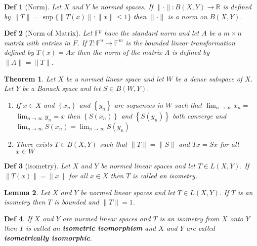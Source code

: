 \documentclass[10pt]{paper}
\newtheorem{theorem}{Theorem}[section]
\newtheorem{definition}{Def}[section]
\newtheorem{lemma}[theorem]{Lemma}
\begin{document}
\begin{definition}[Norm]
    Let $X$ and $Y$ be normed spaces. If $\|\cdot\|: B(X, Y) \rightarrow \mathbb{R}$ is defined by $ \|T\|=\sup \{\|T(x)\|:\|x\| \leq 1\} $ then $\|\cdot\|$ is a norm on $B(X, Y)$.
\end{definition}

\begin{definition}[Norm of Matrix]
    Let $\mathbb{F}^{p}$ have the standard norm and let $A$ be a $m \times n$ matrix with entries in $F$. If $T: \mathbb{F}^{n} \rightarrow \mathbb{F}^{m}$ is the bounded linear transformation defined by $T(x)=A x$ then the norm of the matrix $A$ is defined by $\|A\|=\|T\|$.
\end{definition}

\begin{theorem}
    Let $X$ be a normed linear space and let $W$ be a dense subspace of $X .$ Let $Y$ be a Banach space and let $S \in B(W, Y)$.
    \begin{enumerate}
        \item If $x \in X$ and $\left\{x_{n}\right\}$ and $\left\{y_{n}\right\}$ are sequences in $W$ such that $\lim _{n \rightarrow \infty} x_{n}=$ $\lim _{n \rightarrow \infty} y_{n}=x$ then $\left\{S\left(x_{n}\right)\right\}$ and $\left\{S\left(y_{n}\right)\right\}$ both converge and $\lim _{n \rightarrow \infty} S\left(x_{n}\right) = \lim _{n \rightarrow \infty} S\left(y_{n}\right)
              $
        \item There exists $T \in B(X, Y)$ such that $\|T\|=\|S\|$ and $T x=S x$ for all $x \in W$
    \end{enumerate}
\end{theorem}

\begin{definition}[isometry]
    Let $X$ and $Y$ be normed linear spaces and let $T \in L(X, Y) .$ If $\|T(x)\|=\|x\|$ for all $x \in X$ then $T$ is called an isometry.
\end{definition}

\begin{lemma}
    Let $X$ and $Y$ be normed linear spaces and let $T \in L(X, Y) .$ If $T$ is an isometry then $T$ is bounded and $\|T\|=1$.
\end{lemma}

\begin{definition}
    If $X$ and $Y$ are nurmed linear spaces and $T$ is an isometry from $X$ onto $Y$ then $T$ is called an \textbf{isometric isomorphism} and $X$ and $Y$ are called \textbf{isometrically isomorphic}.
\end{definition}
\end{document}
